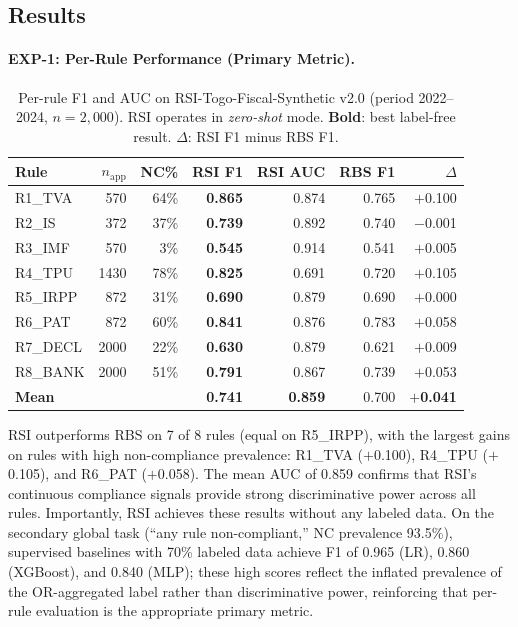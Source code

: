 \documentclass[letterpaper]{article}
\begin{document}
\subsection{Results}

\paragraph{EXP-1: Per-Rule Performance (Primary Metric).}

\begin{table}[H]
\centering
\caption{Per-rule F1 and AUC on RSI-Togo-Fiscal-Synthetic v2.0
         (period 2022--2024, $n=2{,}000$). RSI operates in
         \emph{zero-shot} mode. \textbf{Bold}: best label-free result.
         $\Delta$: RSI F1 minus RBS F1.}
\label{tab:perrule}
\renewcommand{\arraystretch}{1.2}
\begin{tabular}{lrr rrr r}
\toprule
\textbf{Rule} & $n_{\mathrm{app}}$ & \textbf{NC\%}
  & \textbf{RSI F1} & \textbf{RSI AUC} & \textbf{RBS F1}
  & $\Delta$ \\
\midrule
R1\_TVA  &  570 & 64\% & \textbf{0.865} & 0.874 & 0.765 & $+$0.100 \\
R2\_IS   &  372 & 37\% & \textbf{0.739} & 0.892 & 0.740 & $-$0.001 \\
R3\_IMF  &  570 &  3\% & \textbf{0.545} & 0.914 & 0.541 & $+$0.005 \\
R4\_TPU  & 1430 & 78\% & \textbf{0.825} & 0.691 & 0.720 & $+$0.105 \\
R5\_IRPP &  872 & 31\% & \textbf{0.690} & 0.879 & 0.690 & $+$0.000 \\
R6\_PAT  &  872 & 60\% & \textbf{0.841} & 0.876 & 0.783 & $+$0.058 \\
R7\_DECL & 2000 & 22\% & \textbf{0.630} & 0.879 & 0.621 & $+$0.009 \\
R8\_BANK & 2000 & 51\% & \textbf{0.791} & 0.867 & 0.739 & $+$0.053 \\
\midrule
\textbf{Mean} & & & \textbf{0.741} & \textbf{0.859} & 0.700 & $+$\textbf{0.041} \\
\bottomrule
\end{tabular}
\end{table}

RSI outperforms RBS on 7 of 8 rules (equal on R5\_IRPP), with the
largest gains on rules with high non-compliance prevalence: R1\_TVA
($+$0.100), R4\_TPU ($+$0.105), and R6\_PAT ($+$0.058). The mean AUC
of 0.859 confirms that RSI's continuous compliance signals provide
strong discriminative power across all rules. Importantly, RSI achieves
these results without any labeled data. On the secondary global task
(``any rule non-compliant,'' NC prevalence 93.5\%), supervised baselines
with 70\% labeled data achieve F1 of 0.965 (LR), 0.860 (XGBoost), and
0.840 (MLP); these high scores reflect the inflated prevalence of the
OR-aggregated label rather than discriminative power, reinforcing that
per-rule evaluation is the appropriate primary metric.
\end{document}
